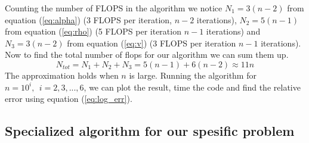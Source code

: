 \documentclass[reprint, english,notitlepage]{revtex4-1}  %
\begin{document}
Counting the number of FLOPS in the algorithm we notice $N_1 = 3(n-2)$ from equation (\ref{eq:alpha}) (3 FLOPS per iteration, $n-2$ iterations), $N_2 = 5(n-1)$ from equation (\ref{eq:rho}) (5 FLOPS per iteration $n-1$ iterations) and $N_3 = 3(n-2)$ from equation (\ref{eq:v}) (3 FLOPS per iteration $n-1$ iterations). Now to find the total number of flops for our algorithm we can sum them up.
\begin{equation*}
	N_{tot} = N_1+N_2+N_3 = 5(n-1) + 6(n-2) \approx 11n
\end{equation*}
The approximation holds when $n$ is large. Running the algorithm for $n=10^i,\ \ i = 2, 3, ..., 6$, we can plot the result, time the code and find the relative error using equation (\ref{eq:log_err}).


\subsection{Specialized algorithm for our spesific problem}
\end{document}
